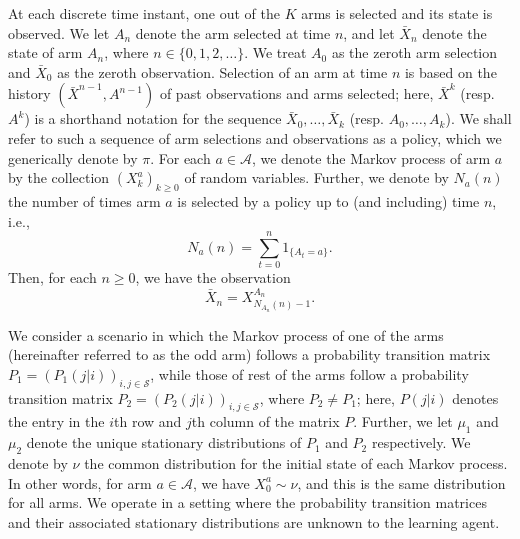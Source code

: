 At each discrete time instant, one out of the $K$ arms is selected and its state is observed. We let $A_n$ denote the arm selected at time $n$, and let $\bar{X}_n$ denote the state of arm $A_n$, where $n\in\{0,1,2,\ldots\}$. We treat $A_0$ as the zeroth arm selection and $\bar{X}_0$ as the zeroth observation. Selection of an arm at time $n$ is based on the history $(\bar{X}^{n-1},A^{n-1})$ of past observations and arms selected; here, $\bar{X}^k$ (resp. $A^k$) is a shorthand notation for the sequence $\bar{X}_0,\ldots,\bar{X}_k$ (resp. $A_0,\ldots,A_k$). We shall refer to such a sequence of arm selections and observations as a policy, which we generically denote by $\pi$. For each $a\in\mathcal{A}$, we denote the Markov process of arm $a$ by the collection $(X_k^a)_{k\geq 0}$ of random variables. Further, we denote by $N_a(n)$ the number of times arm $a$ is selected by a policy up to (and including) time $n$, i.e.,
\begin{equation}
N_a(n)=\sum\limits_{t=0}^{n}1_{\{A_t=a\}}.\label{rested_arms_eq:N_a(n)}	
\end{equation}
 Then, for each $n\geq 0$, we have the observation
\begin{equation}
	\bar{X}_n=X_{N_{A_n}(n)-1}^{A_n}.\label{rested_arms_eq:obs_at_time_n}
\end{equation}

We consider a scenario in which the Markov process of one of the arms (hereinafter referred to as the odd arm) follows a probability transition matrix $P_1=(P_1(j|i))_{i,j\in\mathcal{S}}$, while those of rest of the arms follow a probability transition matrix $P_2=(P_2(j|i))_{i,j\in\mathcal{S}}$, where $P_2\neq P_1$; here, $P(j|i)$ denotes the entry in the $i${th} row and $j$th column of the matrix $P$. Further, we let $\mu_1$ and $\mu_2$ denote the unique stationary distributions of $P_1$ and $P_2$ respectively. We denote by $\nu$ the common distribution for the initial state of each Markov process. In other words, for arm $a\in \mathcal{A}$, we have $X_0^a\sim \nu$, and this is the same distribution for all arms. We operate in a setting where the probability transition matrices and their associated stationary distributions are unknown to the learning agent.

